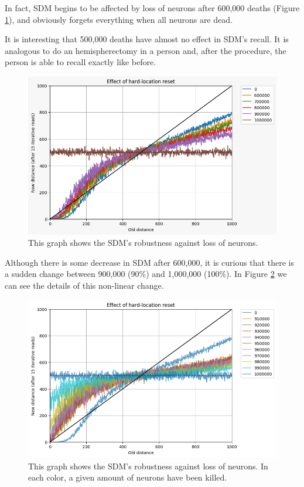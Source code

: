In fact, SDM begins to be affected by loss of neurons after 600,000 deaths (Figure \ref{fig:sdm-neuron-death-1m}), and obviously forgets everything when all neurons are dead.

It is interesting that 500,000 deaths have almost no effect in SDM's recall. It is analogous to do an hemispherectomy in a person and, after the procedure, the person is able to recall exactly like before.

\begin{figure}[h]
\centering\includegraphics[width=\textwidth]{./images02/new-images/sdm-neuron-death-1m.png}
\caption{This graph shows the SDM's robustness against loss of neurons.
\label{fig:sdm-neuron-death-1m}}
\end{figure}

Although there is some decrease in SDM after 600,000, it is curious that there is a sudden change between 900,000 (90\%) and 1,000,000 (100\%). In Figure \ref{fig:sdm-neuron-death-details} we can see the details of this non-linear change.

\begin{figure}[h]
\centering\includegraphics[width=\textwidth]{images02/new-images/sdm-neuron-death.png}
\caption{This graph shows the SDM's robustness against loss of neurons. In each color, a given amount of neurons have been killed.
\label{fig:sdm-neuron-death-details}}
\end{figure}



